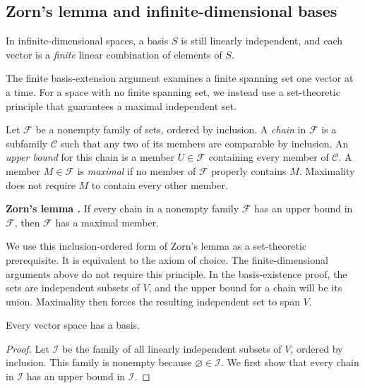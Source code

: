 \subsection{Zorn's lemma and infinite-dimensional bases}
\label{sec:linear-algebra-i:zorns-lemma}

In infinite-dimensional spaces, a basis \(S\) is still linearly independent, and
each vector is a \emph{finite} linear combination of elements of \(S\).

\begin{pendingreview}
The finite basis-extension argument examines a finite spanning set one vector
at a time. For a space with no finite spanning set, we instead use a
set-theoretic principle that guarantees a maximal independent set.

Let \(\mathcal F\) be a nonempty family of sets, ordered by inclusion.
A \emph{chain} in \(\mathcal F\) is a subfamily \(\mathcal C\) such
that any two of its members are comparable by inclusion. An \emph{upper
bound} for this chain is a member \(U\in\mathcal F\) containing every
member of \(\mathcal C\). A member \(M\in\mathcal F\) is
\emph{maximal} if no member of \(\mathcal F\) properly contains \(M\).
Maximality does not require \(M\) to contain every other member.

\textbf{Zorn's lemma \cite{Zorn1935TransfiniteAlgebra}.}
If every chain in a nonempty family \(\mathcal F\) has an upper bound
in \(\mathcal F\), then \(\mathcal F\) has a maximal member.

We use this inclusion-ordered form of Zorn's lemma as a set-theoretic
prerequisite. It is equivalent to the axiom of choice. The finite-dimensional
arguments above do not require this principle. In the basis-existence proof,
the sets are independent subsets of \(V\), and the upper bound for a chain
will be its union. Maximality then forces the resulting independent set to
span \(V\).

\begin{theorem}
  \label{thm:linear-algebra-i:basis-existence}
  Every vector space has a basis.
\end{theorem}

\begin{proof}
  Let \(\mathcal I\) be the family of all linearly independent subsets of
  \(V\), ordered by inclusion. This family is nonempty because
  \(\varnothing\in\mathcal I\). We first show that every chain in
  \(\mathcal I\) has an upper bound in \(\mathcal I\).


\end{proof}
\end{pendingreview}
